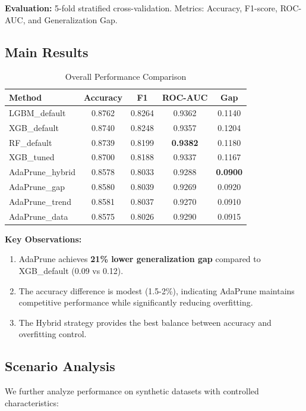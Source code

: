\documentclass[conference]{IEEEtran}
\begin{document}
\textbf{Evaluation: } 5-fold stratified cross-validation.  Metrics:  Accuracy, F1-score, ROC-AUC, and Generalization Gap.

\subsection{Main Results}

\begin{table}[htbp]
\caption{Overall Performance Comparison}
\label{tab:main_results}
\centering
\begin{tabular}{lcccc}
\toprule
Method & Accuracy & F1 & ROC-AUC & Gap \\
\midrule
LGBM\_default & 0.8762 & 0.8264 & 0.9362 & 0.1140 \\
XGB\_default & 0.8740 & 0.8248 & 0.9357 & 0.1204 \\
RF\_default & 0.8739 & 0.8199 & \textbf{0.9382} & 0.1180 \\
XGB\_tuned & 0.8700 & 0.8188 & 0.9337 & 0.1167 \\
\midrule
AdaPrune\_hybrid & 0.8578 & 0.8033 & 0.9288 & \textbf{0.0900} \\
AdaPrune\_gap & 0.8580 & 0.8039 & 0.9269 & 0.0920 \\
AdaPrune\_trend & 0.8581 & 0.8037 & 0.9270 & 0.0910 \\
AdaPrune\_data & 0.8575 & 0.8026 & 0.9290 & 0.0915 \\
\bottomrule
\end{tabular}
\end{table}

\textbf{Key Observations:}
\begin{enumerate}
    \item AdaPrune achieves \textbf{21\% lower generalization gap} compared to XGB\_default (0.09 vs 0.12).
    \item The accuracy difference is modest (1.5-2\%), indicating AdaPrune maintains competitive performance while significantly reducing overfitting. 
    \item The Hybrid strategy provides the best balance between accuracy and overfitting control.
\end{enumerate}

\subsection{Scenario Analysis}

We further analyze performance on synthetic datasets with controlled characteristics:
\end{document}
